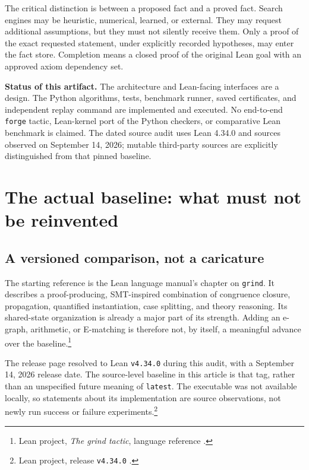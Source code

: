 \documentclass[11pt,a4paper]{article}
\newcommand{\code}[1]{\texttt{#1}}
\begin{document}
The critical distinction is between a proposed fact and a proved fact. Search
engines may be heuristic, numerical, learned, or external. They may request
additional assumptions, but they must not silently receive them. Only a proof
of the exact requested statement, under explicitly recorded hypotheses, may
enter the fact store. Completion means a closed proof of the original Lean
goal with an approved axiom dependency set.

\textbf{Status of this artifact.} The architecture and Lean-facing interfaces
are a design. The Python algorithms, tests, benchmark runner, saved certificates,
and independent replay command are implemented and executed. No end-to-end
\code{forge} tactic, Lean-kernel port of the Python checkers, or comparative Lean
benchmark is claimed. The dated source audit uses Lean 4.34.0 and sources observed
on September 14, 2026; mutable third-party sources are explicitly distinguished
from that pinned baseline.

\clearpage
{\small\setlength{\parskip}{0pt}\tableofcontents}
\clearpage

\section{The actual baseline: what must not be reinvented}
\label{sec:baseline}

\subsection{A versioned comparison, not a caricature}
The starting reference is the Lean language manual's chapter on \code{grind}.
It describes a proof-producing, SMT-inspired combination of congruence closure,
propagation, quantified instantiation, case splitting, and theory reasoning.
Its shared-state organization is already a major part of its strength.
Adding an e-graph, arithmetic, or E-matching is therefore not, by itself, a
meaningful advance over the baseline.\footnote{Lean project, \emph{The grind
tactic}, language reference \cite{grind}.}

The release page resolved to Lean \code{v4.34.0} during this audit, with a
September 14, 2026 release date. The source-level baseline in this article is
that tag, rather than an unspecified future meaning of \code{latest}.
The executable was not available locally, so statements about its implementation
are source observations, not newly run success or failure experiments.\footnote{Lean
project, release \code{v4.34.0} \cite{release}.}
\end{document}
